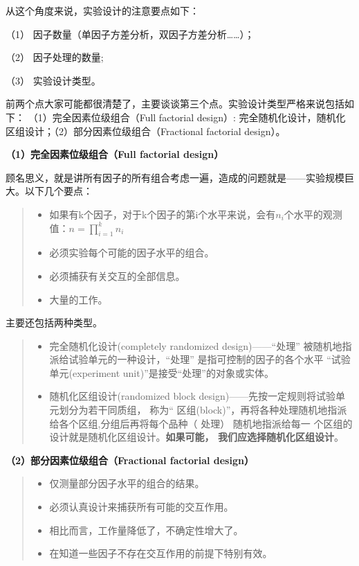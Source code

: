 \documentclass[]{ctexbook}
\providecommand{\tightlist}{%
  \setlength{\itemsep}{0pt}\setlength{\parskip}{0pt}}
\begin{document}
从这个角度来说，实验设计的注意要点如下：

（1） 因子数量（单因子方差分析，双因子方差分析\ldots\ldots）；

（2） 因子处理的数量;

（3） 实验设计类型。

前两个点大家可能都很清楚了，主要谈谈第三个点。实验设计类型严格来说包括如下： （1）完全因素位级组合（Full factorial design）: 完全随机化设计，随机化区组设计；（2）部分因素位级组合（Fractional factorial design）。

\textbf{（1）完全因素位级组合（Full factorial design）}

顾名思义，就是讲所有因子的所有组合考虑一遍，造成的问题就是------实验规模巨大。以下几个要点：

\begin{quote}
\begin{itemize}
\tightlist
\item
  如果有k个因子，对于k个因子的第i个水平来说，会有\(n_i\)个水平的观测值：\(n=\prod_{i=1}^k n_i\)
\item
  必须实验每个可能的因子水平的组合。
\item
  必须捕获有关交互的全部信息。
\item
  大量的工作。
\end{itemize}
\end{quote}

主要还包括两种类型。

\begin{quote}
\begin{itemize}
\tightlist
\item
  完全随机化设计(completely randomized design)------``处理'' 被随机地指派给试验单元的一种设计，``处理'' 是指可控制的因子的各个水平 ``试验单元(experiment unit)''是接受``处理''的对象或实体。
\item
  随机化区组设计(randomized block design)------先按一定规则将试验单元划分为若干同质组， 称为`` 区组(block)''，再将各种处理随机地指派给各个区组,分组后再将每个品种（ 处理） 随机地指派给每一
  个区组的设计就是随机化区组设计。\textbf{如果可能， 我们应选择随机化区组设计}。
\end{itemize}
\end{quote}

\textbf{（2）部分因素位级组合（Fractional factorial design）}

\begin{quote}
\begin{itemize}
\tightlist
\item
  仅测量部分因子水平的组合的结果。
\item
  必须认真设计来捕获所有可能的交互作用。
\item
  相比而言，工作量降低了，不确定性增大了。
\item
  在知道一些因子不存在交互作用的前提下特别有效。
\end{itemize}
\end{quote}
\end{document}
